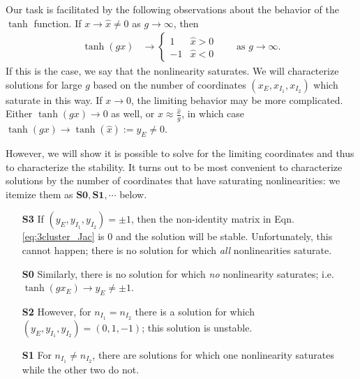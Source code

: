 \documentclass[11pt,reqno]{amsart}
\begin{document}
Our task is facilitated by the following observations about the behavior of the $\tanh$ function. If $x \rightarrow \hat{x} \neq 0$ as $g \rightarrow \infty$, then
\begin{align*}
    \tanh(gx) &\rightarrow 
    \begin{cases}
    1 & \hat{x} > 0\\
    -1 & \hat{x} < 0
    \end{cases}
&&\text{ as } g \rightarrow \infty.
\end{align*}
If this is the case, we say that the nonlinearity saturates. We will characterize solutions for large $g$ based on the number of coordinates $(x_E, x_{I_1}, x_{I_2})$ which saturate in this way. If $x \rightarrow 0$, the limiting behavior may be more complicated. Either $\tanh(g x) \rightarrow 0$ as well, or $x \approx \frac{\hat{x}}{g}$, in which case $\tanh(g x) \rightarrow \tanh(\hat{x}) := y_E \neq 0$.  

However, we will show it is possible to solve for the limiting coordinates and thus to characterize the stability. It turns out to be most convenient to characterize solutions by the number of coordinates that have saturating nonlinearities: we itemize them as $\textbf{S0}, \textbf{S1}, \cdots$ below.

\begin{enumerate}
    \item[\textbf{S3}] If $(y_E,y_{I_1},y_{I_2}) = \pm 1$, then the non-identity matrix in Eqn. \eqref{eq:3cluster_Jac} is 0 and the solution will be stable. Unfortunately, this cannot happen; there is no solution for which \textit{all} nonlinearities saturate.
    \item[\textbf{S0}] Similarly, there is no solution for which \textit{no} nonlinearity saturates; i.e. $\tanh(g x_E) \rightarrow y_E \not= \pm 1$.
    \item[\textbf{S2}] However, for $n_{I_1} = n_{I_2}$ there is a solution for which $(y_E,y_{I_1},y_{I_2}) = (0,1,-1)$; this solution is unstable. 
    \item[\textbf{S1}] For $n_{I_1}\not=n_{I_2}$, there are solutions for which one nonlinearity saturates while the other two do not.
\end{enumerate}

% 
\end{document}
